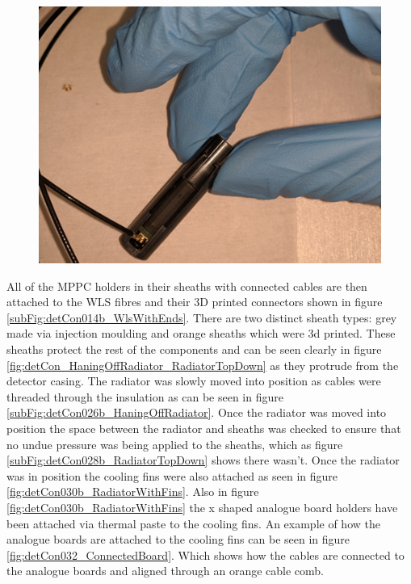 \begin{figure}[htbp]
\centering
\includegraphics[width=0.8\linewidth]{Chapter3/Figs/Raster/detCon023b_HoldersConnectedZoom.png}
\label{fig:detCon023b_HoldersConnectedZoom}
\end{figure}

All of the MPPC holders in their sheaths with connected cables are then attached to the WLS fibres and their 3D printed connectors shown in figure \ref{subFig:detCon014b_WlsWithEnds}. There are two distinct sheath types: grey made via injection moulding and orange sheaths which were 3d printed. These sheaths protect the rest of the components and can be seen clearly in figure \ref{fig:detCon_HaningOffRadiator_RadiatorTopDown} as they protrude from the detector casing. The radiator was slowly moved into position as cables were threaded through the insulation as can be seen in figure \ref{subFig:detCon026b_HaningOffRadiator}. Once the radiator was moved into position the space between the radiator and sheaths was checked to ensure that no undue pressure was being applied to the sheaths, which as figure \ref{subFig:detCon028b_RadiatorTopDown} shows there wasn't. Once the radiator was in position the cooling fins were also attached as seen in figure \ref{fig:detCon030b_RadiatorWithFins}. Also in figure \ref{fig:detCon030b_RadiatorWithFins} the x shaped analogue board holders have been attached via thermal paste to the cooling fins. An example of how the analogue boards are attached to the cooling fins can be seen in figure \ref{fig:detCon032_ConnectedBoard}. Which shows how the cables are connected to the analogue boards and aligned through an orange cable comb. 

